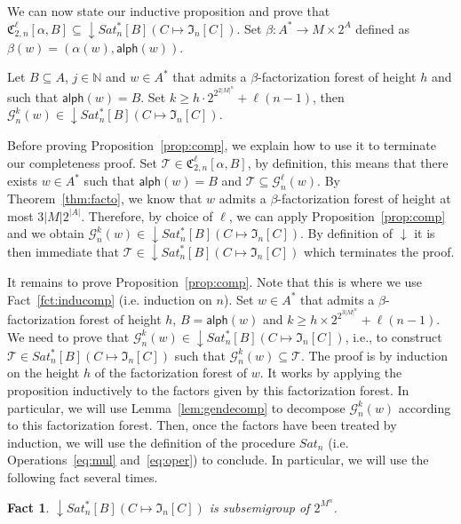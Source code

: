 \documentclass[envcountsame]{llncs}
\newcommand\nat{\ensuremath{\mathbb{N}}\xspace}
\newcommand\fCgen[3]{\ensuremath{\fC_{#1,#3}^{#2}}\xspace}
\newcommand\Gs{\ensuremath{\mathcal{G}}\xspace}
\newcommand\Ts{\ensuremath{\mathcal{T}}\xspace}
\let\geq\geqslant
\newcommand\content[1]{\ensuremath{\contentmorphism(#1)}}
\newcommand\contentmorphism{\ensuremath{\textsf{alph}}}
\newcommand\fI{\ensuremath{\mathfrak I}\xspace}
\newcommand\fC{\ensuremath{\mathfrak C}\xspace}
\DeclareMathOperator{\downclos}{\downarrow}
\newtheorem{fact}[theorem]{Fact}
\begin{document}
We can now state our inductive proposition and prove that
$\fCgen2{\ell}{n}[\alpha,B] \subseteq \downclos Sat^{*}_n[B](C \mapsto
\fI_n[C])$. Set $\beta : A^* \rightarrow M \times 2^A$ defined as 
$\beta(w) =  (\alpha(w),\content{w})$.

\begin{proposition} \label{prop:comp}
  Let $B \subseteq A$, $j \in \nat$ and $w \in A^*$ that admits a
  $\beta$-factorization forest of height $h$ and such that $\content{w}
  = B$. Set $k \geq  h \cdot 2^{2^{2|M|^n}} + \ell(n-1)$, then $\Gs_n^k(w) \in
  \downclos Sat^{*}_n[B](C \mapsto \fI_n[C])$.
\end{proposition}

Before proving Proposition~\ref{prop:comp}, we explain how to use it
to terminate our completeness proof. Set $\Ts \in
\fCgen2{\ell}{n}[\alpha,B]$, by definition, this means that there exists
$w \in A^*$ such that $\content{w} = B$ and $\Ts \subseteq
\Gs_n^{\ell}(w)$. By Theorem~\ref{thm:facto}, we know that $w$ admits a
$\beta$-factorization forest of height at most $3|M|2^{|A|}$.
Therefore, by choice of $\ell$, we can apply
Proposition~\ref{prop:comp} and we obtain $\Gs_n^k(w) \in 
\downclos Sat^{*}_n[B](C \mapsto \fI_n[C])$. By definition of
$\downclos$ it is then immediate that $\Ts \in \downclos
Sat^{*}_n[B](C \mapsto \fI_n[C])$ which terminates the proof.

It remains to prove Proposition~\ref{prop:comp}. Note that this is
where we use Fact~\ref{fct:inducomp} (i.e. induction on $n$).
Set $w \in A^*$ that admits a $\beta$-factorization forest of height
$h$, $B = \content{w}$ and $k \geq h \times 2^{2^{3|M|^n}} +
\ell(n-1)$. We need to prove that $\Gs_n^k(w) \in \downclos
Sat^{*}_n[B](C \mapsto \fI_n[C])$, i.e., to construct $\Ts \in
Sat^{*}_n[B](C \mapsto \fI_n[C])$ such that $\Gs_n^k(w) \subseteq
\Ts$. The proof is by induction on the height $h$ of the factorization
forest of $w$. It works by applying the proposition inductively to
the factors given by this factorization forest. In particular, we
will use Lemma~\ref{lem:gendecomp} to decompose $\Gs_n^k(w)$
according to this factorization forest. Then, once the factors have
been treated by induction, we will use the definition of the
procedure $Sat_n$ (i.e. Operations~\eqref{eq:mul} and~\eqref{eq:oper})
to conclude. In particular, we will use the following fact several
times.

\begin{fact} \label{fct:semig}
  $\downclos Sat^{*}_n[B](C \mapsto \fI_n[C])$ is subsemigroup of $2^{M^n}$.
\end{fact}
\end{document}
